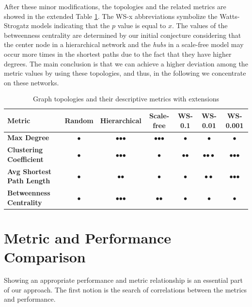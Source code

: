 After these minor modifications, the topologies and the related metrics are showed in the extended Table \ref{tab:topology_metrics2}. The \textsf{WS-x} abbreviations symbolize the Watts-Strogatz models indicating that the $p$ value is equal to $x$. The values of the betweenness centrality are determined by our initial conjecture considering that the center node in a hierarchical network and the \textit{hubs} in a scale-free model may occur more times in the shortest paths due to the fact that they have higher degrees. The main conclusion is that we can achieve a higher deviation among the metric values by using these topologies, and thus, in the following we concentrate on these networks.
\begin{table}[ht]
	\footnotesize
	\centering
	
	\begin{tabular}{ l c c c c c c}
		\toprule
		Metric & Random & Hierarchical & Scale-free & WS-0.1 & WS-0.01 & WS-0.001 \\ 
		\midrule 
		\textbf{Max Degree} & $\bullet$ & $\bullet$$\bullet$$\bullet$ & $\bullet$$\bullet$$\bullet$ & $\bullet$ & $\bullet$ & $\bullet$ \\ \hline
		\textbf{Clustering Coefficient} & $\bullet$ & $\bullet$$\bullet$$\bullet$ & $\bullet$ & $\bullet$$\bullet$ & $\bullet$$\bullet \bullet$ & $\bullet$$\bullet$$\bullet$\\ \hline
		\textbf{Avg Shortest Path Length} & $\bullet$ & $\bullet$$\bullet$ & $\bullet$ & $\bullet $ & $\bullet \bullet$ & $\bullet$$\bullet$$\bullet$\\ \hline
		\textbf{Betweenness Centrality} & $\bullet$ & $\bullet$$\bullet$$\bullet$ & $\bullet$$\bullet$ & $\bullet$ & $\bullet$ & $\bullet$\\ \hline
		\bottomrule
	\end{tabular}
	\caption{Graph topologies and their descriptive metrics with extensions}
	\label{tab:topology_metrics2}
\end{table}

\section{Metric and Performance Comparison}

Showing an appropriate performance and metric relationship is an essential part of our approach. The first notion is the search of correlations between the metrics and performance.

